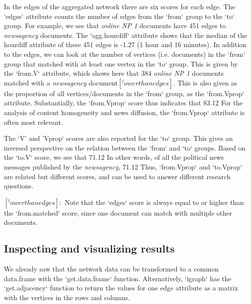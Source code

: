 In the edges of the aggregated network there are six scores for each edge. 
The `edges` attribute counts the number of edges from the `from` group to the `to` group. 
For example, we see that \emph{online NP 1} documents have 451 edges to \emph{newsagency} documents.
The `agg.hourdiff` attribute shows that the median of the hourdiff attribute of these 451 edges is -1.27 (1 hour and 16 minutes).
In addition to the edges, we can look at the number of vertices (i.e. documents) in the `from` group that matched with at least one vertex in the `to` group. 
This is given by the `from.V` attribute, which shows here that 384 \emph{online NP 1} documents matched with a \emph{newsagency} document$[^lowerthanedges]$.
This is also given as the proportion of all vertices/documents in the `from` group, as the `from.Vprop` attribute.
Substantially, the `from.Vprop` score thus indicates that 83.12%
For the analysis of content homogeneity and news diffusion, the `from.Vprop` attribute is often most relevant.

The `V' and 'Vprop` scores are also reported for the `to` group. 
This gives an inversed perspective on the relation between the `from` and `to` groups.
Based on the `to.V` score, we see that 71.12%
In other words, of all the political news messages published by the \emph{newsagency}, 71.12%
Thus, `from.Vprop` and `to.Vprop` are related but different scores, and can be used to answer different research questions.

$[^lowerthanedges]:$ Note that the `edges` score is always equal to or higher than the `from.matched` score, since one document can match with multiple other documents. 

\subsection{Inspecting and visualizing results}

We already saw that the network data can be transformed to a common data.frame with the `get.data.frame` function.
Alternatively, `igraph` has the `get.adjacency` function to return the values for one edge attribute as a matrix with the vertices in the rows and columns.

